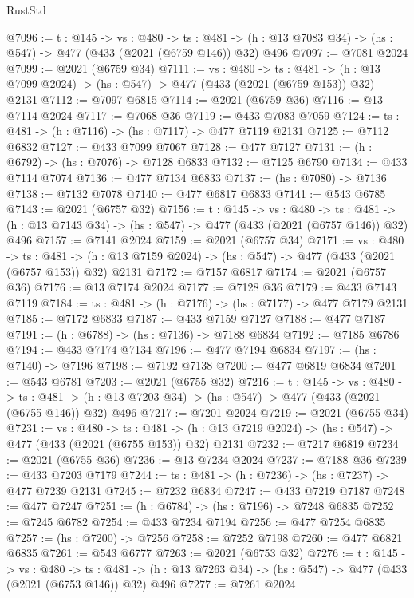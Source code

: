 \begin{lexlean}{RustStd}
\begin{coremodule}
@7096 := {t : @145} ->
  {vs : @480} ->
  {ts : @481} -> (h : @13 @7083 @34) -> (hs : @547) -> @477 (@433 (@2021 (@6759 @146)) @32) @496
@7097 := @7081 @2024
@7099 := @2021 (@6759 @34)
@7111 := {vs : @480} ->
  {ts : @481} -> (h : @13 @7099 @2024) -> (hs : @547) -> @477 (@433 (@2021 (@6759 @153)) @32) @2131
@7112 := @7097 @6815
@7114 := @2021 (@6759 @36)
@7116 := @13 @7114 @2024
@7117 := @7068 @36
@7119 := @433 @7083 @7059
@7124 := {ts : @481} -> (h : @7116) -> (hs : @7117) -> @477 @7119 @2131
@7125 := @7112 @6832
@7127 := @433 @7099 @7067
@7128 := @477 @7127
@7131 := (h : @6792) -> (hs : @7076) -> @7128 @6833
@7132 := @7125 @6790
@7134 := @433 @7114 @7074
@7136 := @477 @7134 @6833
@7137 := (hs : @7080) -> @7136
@7138 := @7132 @7078
@7140 := @477 @6817 @6833
@7141 := @543 @6785
@7143 := @2021 (@6757 @32)
@7156 := {t : @145} ->
  {vs : @480} ->
  {ts : @481} -> (h : @13 @7143 @34) -> (hs : @547) -> @477 (@433 (@2021 (@6757 @146)) @32) @496
@7157 := @7141 @2024
@7159 := @2021 (@6757 @34)
@7171 := {vs : @480} ->
  {ts : @481} -> (h : @13 @7159 @2024) -> (hs : @547) -> @477 (@433 (@2021 (@6757 @153)) @32) @2131
@7172 := @7157 @6817
@7174 := @2021 (@6757 @36)
@7176 := @13 @7174 @2024
@7177 := @7128 @36
@7179 := @433 @7143 @7119
@7184 := {ts : @481} -> (h : @7176) -> (hs : @7177) -> @477 @7179 @2131
@7185 := @7172 @6833
@7187 := @433 @7159 @7127
@7188 := @477 @7187
@7191 := (h : @6788) -> (hs : @7136) -> @7188 @6834
@7192 := @7185 @6786
@7194 := @433 @7174 @7134
@7196 := @477 @7194 @6834
@7197 := (hs : @7140) -> @7196
@7198 := @7192 @7138
@7200 := @477 @6819 @6834
@7201 := @543 @6781
@7203 := @2021 (@6755 @32)
@7216 := {t : @145} ->
  {vs : @480} ->
  {ts : @481} -> (h : @13 @7203 @34) -> (hs : @547) -> @477 (@433 (@2021 (@6755 @146)) @32) @496
@7217 := @7201 @2024
@7219 := @2021 (@6755 @34)
@7231 := {vs : @480} ->
  {ts : @481} -> (h : @13 @7219 @2024) -> (hs : @547) -> @477 (@433 (@2021 (@6755 @153)) @32) @2131
@7232 := @7217 @6819
@7234 := @2021 (@6755 @36)
@7236 := @13 @7234 @2024
@7237 := @7188 @36
@7239 := @433 @7203 @7179
@7244 := {ts : @481} -> (h : @7236) -> (hs : @7237) -> @477 @7239 @2131
@7245 := @7232 @6834
@7247 := @433 @7219 @7187
@7248 := @477 @7247
@7251 := (h : @6784) -> (hs : @7196) -> @7248 @6835
@7252 := @7245 @6782
@7254 := @433 @7234 @7194
@7256 := @477 @7254 @6835
@7257 := (hs : @7200) -> @7256
@7258 := @7252 @7198
@7260 := @477 @6821 @6835
@7261 := @543 @6777
@7263 := @2021 (@6753 @32)
@7276 := {t : @145} ->
  {vs : @480} ->
  {ts : @481} -> (h : @13 @7263 @34) -> (hs : @547) -> @477 (@433 (@2021 (@6753 @146)) @32) @496
@7277 := @7261 @2024

\end{coremodule}
\end{lexlean}
